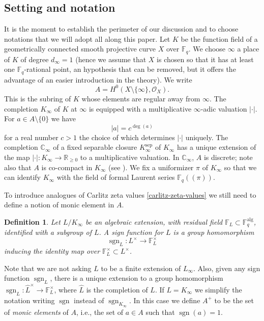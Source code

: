 \documentclass[11pt]{amsart}
\numberwithin{equation}{section}
\newcommand{\FF}{\mathbb{F}}
\newcommand{\CC}{\mathbb{C}}
\newcommand{\RR}{\mathbb{R}}
\newcommand{\sgn}{\operatorname{sgn}}
\newtheorem{Definition}[Theorem]{Definition}
\begin{document}
\subsection{Setting and notation}
It is the moment to establish the perimeter of our discussion and to choose notations that we will adopt all along this paper.
Let $K$ be the function field of a geometrically connected smooth projective curve $X$ over $\FF_q$. We choose $\infty$ a place of $K$ of degree $d_\infty=1$ (hence we assume that $X$ is chosen so that it has at least one $\FF_q$-rational point, an hypothesis that can be removed, but it offers the advantage of an easier introduction in the theory).  We write 
\begin{equation}\label{A}
A=H^0(X\setminus\{\infty\},\mathcal{O}_X).
\end{equation} 
This is the subring of $K$ whose elements are regular away from $\infty$.  The completion $K_\infty$ of $K$ at $\infty$ is equipped with a multiplicative $\infty$-adic valuation $|\cdot|$. For $a\in A\setminus\{0\}$ we have 
$$|a|=c^{\deg(a)}$$
for a real number $c>1$ the choice of which determines $|\cdot|$ uniquely. 
The completion $\mathbb C_\infty$ of a fixed separable closure $K_\infty^{\text{sep}}$ of $K_\infty$ 
has a unique extension of the map $|\cdot|:K_\infty\rightarrow\RR_{\geq 0}$ to a multiplicative valuation. 
In $\CC_\infty$, $A$ is discrete; note also that $A$ is co-compact in $K_\infty$ (see \cite[Lemma 4.2.5]{PEL5}).
We fix a uniformizer $\pi$ of $K_\infty$ so that we can identify $K_\infty$ with the field of formal Laurent series 
$\FF_q((\pi))$. 

To introduce analogues of Carlitz zeta values \eqref{carlitz-zeta-values} we still need to define a notion of monic element in $A$. 

\begin{Definition}\label{sign-function}{\em Let $L/K_\infty$ be an algebraic extension, with residual field $\FF_L\subset\FF_q^{\text{alg}}$, identified with a subgroup of $L$.
A {\em sign function} for $L$ is a group homomorphism 
$$\sgn_L:L^\times \rightarrow \FF_L^\times$$  inducing the identity map over $\FF_L^\times\subset L^\times$.
}
\end{Definition}
Note that we are not asking $L$ to be a finite extension of $L_\infty$. Also, given any sign function $\sgn_L$, there is a unique 
extension to a group homomorphism $\sgn_L:\widehat{L}^\times\to\FF_L^\times$, where $\widehat{L}$ is the completion of $L$.
If $L=K_\infty$ we simplify the notation writing $\sgn$
instead of $\sgn_{K_\infty}$. In this case we define $A^+$ to be the set of {\em monic elements} of $A$, i.e., the set of $a \in A$ such that $\sgn(a)=1$. 
\end{document}
